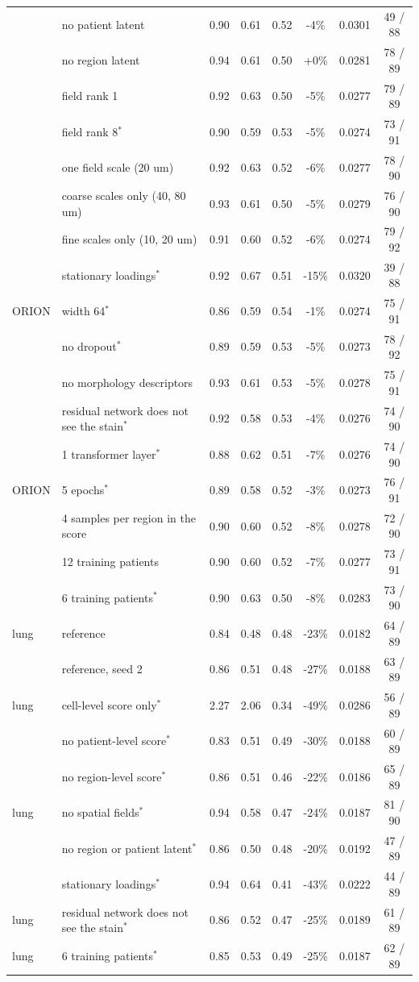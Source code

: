 \begin{longtable}{@{}p{.50in}p{2in}cccccc@{}}
 & no patient latent & 0.90 & 0.61 & 0.52 & -4\% & 0.0301 & 49 / 88 \\
 & no region latent & 0.94 & 0.61 & 0.50 & +0\% & 0.0281 & 78 / 89 \\
 & field rank 1 & 0.92 & 0.63 & 0.50 & -5\% & 0.0277 & 79 / 89 \\
 & field rank 8$^*$ & 0.90 & 0.59 & 0.53 & -5\% & 0.0274 & 73 / 91 \\
 & one field scale (20 um) & 0.92 & 0.63 & 0.52 & -6\% & 0.0277 & 78 / 90 \\
 & coarse scales only (40, 80 um) & 0.93 & 0.61 & 0.50 & -5\% & 0.0279 & 76 / 90 \\
 & fine scales only (10, 20 um) & 0.91 & 0.60 & 0.52 & -6\% & 0.0274 & 79 / 92 \\
 & stationary loadings$^*$ & 0.92 & 0.67 & 0.51 & -15\% & 0.0320 & 39 / 88 \\
\addlinespace
ORION & width 64$^*$ & 0.86 & 0.59 & 0.54 & -1\% & 0.0274 & 75 / 91 \\
 & no dropout$^*$ & 0.89 & 0.59 & 0.53 & -5\% & 0.0273 & 78 / 92 \\
 & no morphology descriptors & 0.93 & 0.61 & 0.53 & -5\% & 0.0278 & 75 / 91 \\
 & residual network does not see the stain$^*$ & 0.92 & 0.58 & 0.53 & -4\% & 0.0276 & 74 / 90 \\
 & 1 transformer layer$^*$ & 0.88 & 0.62 & 0.51 & -7\% & 0.0276 & 74 / 90 \\
\addlinespace
ORION & 5 epochs$^*$ & 0.89 & 0.58 & 0.52 & -3\% & 0.0273 & 76 / 91 \\
 & 4 samples per region in the score & 0.90 & 0.60 & 0.52 & -8\% & 0.0278 & 72 / 90 \\
 & 12 training patients & 0.90 & 0.60 & 0.52 & -7\% & 0.0277 & 73 / 91 \\
 & 6 training patients$^*$ & 0.90 & 0.63 & 0.50 & -8\% & 0.0283 & 73 / 90 \\
\addlinespace
lung & reference & 0.84 & 0.48 & 0.48 & -23\% & 0.0182 & 64 / 89 \\
 & reference, seed 2 & 0.86 & 0.51 & 0.48 & -27\% & 0.0188 & 63 / 89 \\
\addlinespace
lung & cell-level score only$^*$ & 2.27 & 2.06 & 0.34 & -49\% & 0.0286 & 56 / 89 \\
 & no patient-level score$^*$ & 0.83 & 0.51 & 0.49 & -30\% & 0.0188 & 60 / 89 \\
 & no region-level score$^*$ & 0.86 & 0.51 & 0.46 & -22\% & 0.0186 & 65 / 89 \\
\addlinespace
lung & no spatial fields$^*$ & 0.94 & 0.58 & 0.47 & -24\% & 0.0187 & 81 / 90 \\
 & no region or patient latent$^*$ & 0.86 & 0.50 & 0.48 & -20\% & 0.0192 & 47 / 89 \\
 & stationary loadings$^*$ & 0.94 & 0.64 & 0.41 & -43\% & 0.0222 & 44 / 89 \\
\addlinespace
lung & residual network does not see the stain$^*$ & 0.86 & 0.52 & 0.47 & -25\% & 0.0189 & 61 / 89 \\
\addlinespace
lung & 6 training patients$^*$ & 0.85 & 0.53 & 0.49 & -25\% & 0.0187 & 62 / 89 \\
\end{longtable}

